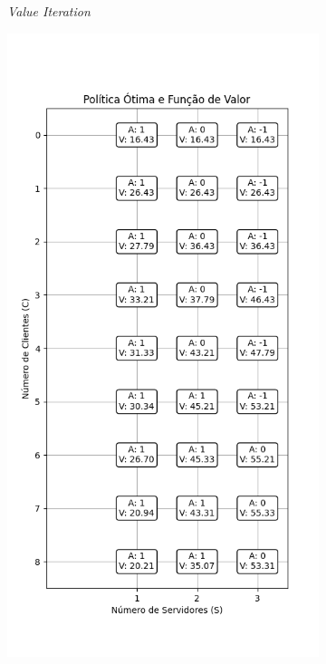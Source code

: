 \begin{figure}[H]
\begin{subfigure}{0.3\textwidth}
        \caption{\textit{Value Iteration}}
    \end{subfigure}
    \begin{subfigure}{0.3\textwidth}
        \centering
        \includegraphics[width=\linewidth]{fig/policy_iteration_policy_and_values.png}

\end{subfigure}
\end{figure}
